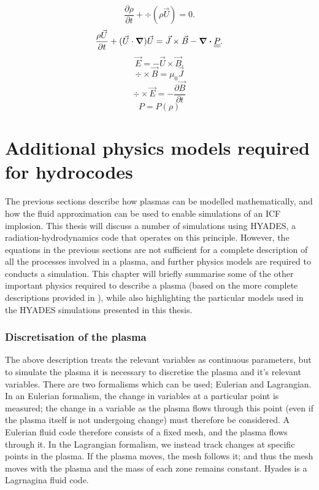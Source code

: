 \begin{equation} \frac{\partial \rho}{\partial t} + \div (\rho \vec{U}) = 0. \end{equation}
\begin{equation} \frac{\rho \vec{U}}{\partial t} + (\vec{U} \cdot \grad)\vec{U} =\vec{J} \times \vec{B} - \div \underline{\underline{P}} .\end{equation}
\begin{equation} \vec{E} = -\vec{U}\times\vec{B} . \end{equation}
\begin{equation} \div \times \vec{B} = \mu_0 \vec{J} \end{equation}
\begin{equation} \div \times \vec{E} = - \frac{\partial \vec{B}}{\partial t} \end{equation}
\begin{equation} P = P(\rho) \end{equation}






\section{Additional physics models required for hydrocodes}

The previous sections describe how plasmas can be modelled mathematically, and how the fluid approximation can be used to enable simulations of an ICF implosion. This thesis will discuss a number of simulations using HYADES, a radiation-hydrodynamics code that operates on this principle. However, the equations in the previous sections are not sufficient for a complete description of all the processes involved in a plasma, and further physics models are required to conducts a simulation. This chapter will briefly summarise some of the other important physics required to describe a plasma (based on the more complete descriptions provided in \cite{Colvin2013}), while also highlighting the particular models used in the HYADES simulations presented in this thesis.

\subsubsection{Discretisation of the plasma}
The above description treats the relevant variables as continuous parameters, but to simulate the plasma it is necessary to discretise the plasma and it's relevant variables. There are two formalisms which can be used; Eulerian and Lagrangian. In an Eulerian formalism, the change in variables at a particular point is measured; the change in a variable as the plasma flows through this point (even if the plasma itself is not undergoing change) must therefore be considered. A Eulerian fluid code therefore consists of a fixed mesh, and the plasma flows through it. In the Lagrangian formalism, we instead track changes at specific points in the plasma. If the plasma moves, the mesh follows it; and thus the mesh moves with the plasma and the mass of each zone remains constant. Hyades is a Lagrnagina fluid code.

